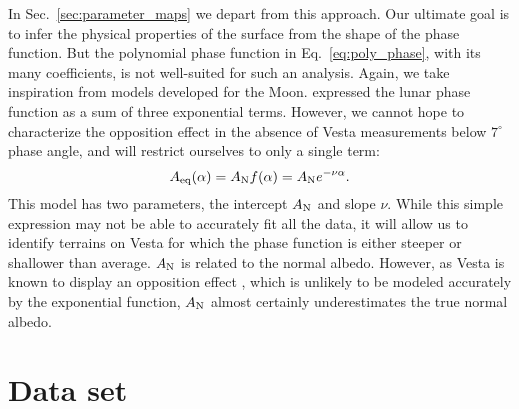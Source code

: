 \documentclass[3p,authoryear]{elsarticle}
\begin{document}
In Sec.~\ref{sec:parameter_maps} we depart from this approach. Our ultimate goal is to infer the physical properties of the surface from the shape of the phase function. But the polynomial phase function in Eq.~\ref{eq:poly_phase}, with its many coefficients, is not well-suited for such an analysis. Again, we take inspiration from models developed for the Moon. \citet{V11} expressed the lunar phase function as a sum of three exponential terms. However, we cannot hope to characterize the opposition effect in the absence of Vesta measurements below $7^\circ$ phase angle, and will restrict ourselves to only a single term:
\begin{equation}
A_{\rm eq}(\alpha) = A_{\rm N} f(\alpha) = A_{\rm N} e^{-\nu \alpha}.
\label{eq:exp_model}
\end{equation}
This model has two parameters, the intercept $A_{\rm N}$ and slope $\nu$. While this simple expression may not be able to accurately fit all the data, it will allow us to identify terrains on Vesta for which the phase function is either steeper or shallower than average. $A_{\rm N}$ is related to the normal albedo. However, as Vesta is known to display an opposition effect \citep{H09}, which is unlikely to be modeled accurately by the exponential function, $A_{\rm N}$ almost certainly underestimates the true normal albedo.


\section{Data set}
\label{sec:data_set}
\end{document}
